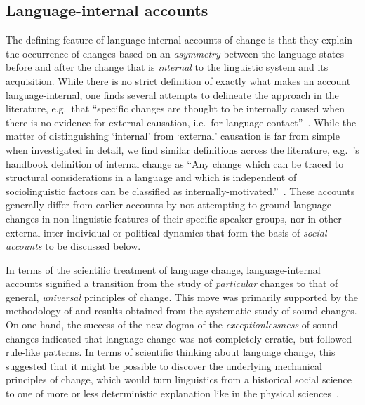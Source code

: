 \subsection{Language-internal accounts}

The defining feature of language-internal accounts of change is that they explain the occurrence of changes based on an \emph{asymmetry} between the language states before and after the change that is \emph{internal} to the linguistic system and its acquisition. %
While there is no strict definition of exactly what makes an account language-internal, one finds several attempts to delineate the approach in the literature, e.g.~that ``specific changes are thought to be internally caused when there is no evidence for external causation, i.e.~for language contact''~\citep[p.366]{Luraghi2010}.
While the matter of distinguishing `internal' from `external' causation is far from simple when investigated in detail, we find similar definitions across the literature, e.g.~\citeauthor{Hickey2012}'s handbook definition of internal change as ``Any change which can be traced to structural considerations in a language and which is independent of sociolinguistic factors can be classified as internally-motivated.''~\citeyearpar[p.388]{Hickey2012}.
These accounts generally differ from earlier accounts by not attempting to ground language changes in non-linguistic features of their specific speaker groups, nor in other external inter-individual or political dynamics that form the basis of \emph{social accounts} to be discussed below.

In terms of the scientific treatment of language change, language-internal accounts signified a transition from the study of \emph{particular} changes to that of general, \emph{universal} principles of change. This move was primarily supported by the methodology of and results obtained from the systematic study of sound changes. On one hand, the success of the new dogma of the \emph{exceptionlessness} of sound changes indicated that language change was not completely erratic, but followed rule-like patterns. In terms of scientific thinking about language change, this suggested that it might be possible to discover the underlying mechanical principles of change, which would turn linguistics from a historical social science to one of more or less deterministic explanation like in the physical sciences~\citep{Sapir1929}.

